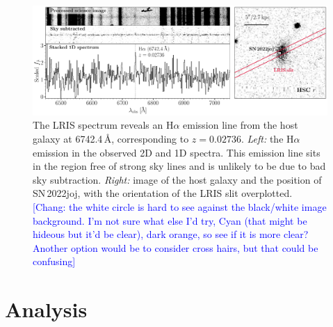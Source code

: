 \documentclass[twocolumn]{aastex631}
\newcommand{\sn}{SN\,2022joj}
\newcommand{\chang}[1]{\textcolor{blue}{[Chang: #1]}}
\begin{document}
\begin{CJK*}{UTF8}{gbsn}
\begin{figure}
    \label{fig:spec_seq}
\end{figure}
\begin{figure}
    \centering
    \includegraphics[width=\linewidth]{host_spec.pdf}
    \caption{The LRIS spectrum reveals an H$\alpha$ emission line from the host galaxy at 6742.4\,\AA, corresponding to $z=0.02736$. \textit{Left:} the H$\alpha$ emission in the observed 2D and 1D spectra. This emission line sits in the region free of strong sky lines and is unlikely to be due to bad sky subtraction.
    \textit{Right:} image of the host galaxy and the position of \sn, with the orientation of the LRIS slit overplotted. \chang{the white circle is hard to see against the black/white image background. I'm not sure what else I'd try, Cyan (that might be hideous but it'd be clear), dark orange, so see if it is more clear? Another option would be to consider cross hairs, but that could be confusing}   
    }
    \label{fig:host_spec}
\end{figure}


\section{Analysis} \label{sec:analysis}

\end{CJK*}
\end{document}
